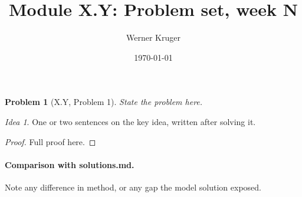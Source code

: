 \documentclass[11pt,a4paper]{article}
\title{Module X.Y: Problem set, week N}
\author{Werner Kruger}
\date{\today}
\newtheorem*{problem}{Problem}
\theoremstyle{remark}
\newtheorem*{idea}{Idea}
\begin{document}
\maketitle

\begin{problem}[X.Y, Problem 1]
State the problem here.
\end{problem}

\begin{idea}
One or two sentences on the key idea, written after solving it.
\end{idea}

\begin{proof}
Full proof here.
\end{proof}

\paragraph{Comparison with solutions.md.}
Note any difference in method, or any gap the model solution exposed.
\end{document}
